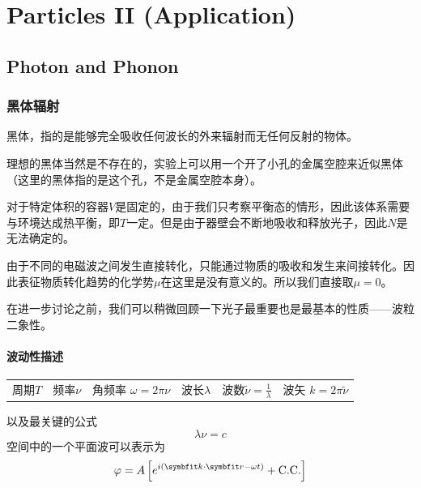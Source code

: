 \chapter{Particles II (Application)} %
\label{cha:particles II (Application)}
\section{Photon and Phonon} %
\label{sec:photon_and_phonon}
\subsection{黑体辐射} %
\label{sub:黑体辐射}
\begin{definition}[黑体\index{黑体}]
    黑体，指的是能够完全吸收任何波长的外来辐射而无任何反射的物体。
\end{definition}

理想的黑体当然是不存在的，实验上可以用一个开了小孔的金属空腔来近似黑体（这里的黑体指的是这个孔，不是金属空腔本身）。

对于特定体积的容器$V$是固定的，由于我们只考察平衡态的情形，因此该体系需要与环境达成热平衡，即$T$一定。但是由于器壁会不断地吸收和释放光子，因此$N$是无法确定的。

\begin{remark}
    由于不同的电磁波之间发生直接转化，只能通过物质的吸收和发生来间接转化。因此表征物质转化趋势的化学势$\mu$在这里是没有意义的。所以我们直接取$\mu=0$。
\end{remark}

在进一步讨论之前，我们可以稍微回顾一下光子最重要也是最基本的性质——波粒二象性。

\subsubsection{波动性描述}

\begin{table}[h]
    \centering
    \begin{tabular}{cccccc}
        周期$T$ & 频率$\nu$ & 角频率 $\omega =2\pi \nu$ & 波长$\lambda$ & 波数$\widetilde{\nu}=\frac{1}{\lambda}$ & 波矢 $k=2\pi \widetilde{\nu}$ \\
    \end{tabular}
\end{table}

以及最关键的公式\begin{equation}
    \lambda \nu =c
\end{equation}
空间中的一个平面波可以表示为\begin{equation}
    \varphi=A\left[e^{i(\bd{k} \cdot \bd{r}-\omega t)}+\text{C.C.}\right]
\end{equation}

